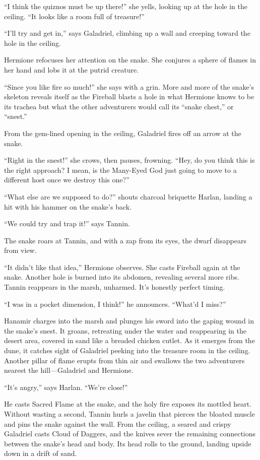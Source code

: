 \documentclass[smalldemyvopaper,11pt,twoside,onecolumn,openright,extrafontsizes]{memoir}
\begin{document}
``I think the quiznos must be up there!'' she yells, looking up at the
hole in the ceiling. ``It looks like a room full of treasure!''

``I'll try and get in,'' says Galadriel, climbing up a wall and creeping
toward the hole in the ceiling.

Hermione refocuses her attention on the snake. She conjures a sphere of
flames in her hand and lobs it at the putrid creature.

``Since you like fire so much!'' she says with a grin. More and more of
the snake's skeleton reveals itself as the Fireball blasts a hole in
what Hermione knows to be its trachea but what the other adventurers
would call its ``snake chest,'' or ``snest.''

From the gem-lined opening in the ceiling, Galadriel fires off an arrow
at the snake.

``Right in the snest!'' she crows, then pauses, frowning. ``Hey, do you
think this is the right approach? I mean, is the Many-Eyed God just
going to move to a different host once we destroy this one?''

``What else are we supposed to do?'' shouts charcoal briquette Harlan,
landing a hit with his hammer on the snake's back.

``We could try and trap it!'' says Tannin.

The snake roars at Tannin, and with a zap from its eyes, the dwarf
disappears from view.

``It didn't like that idea,'' Hermione observes. She casts Fireball
again at the snake. Another hole is burned into its abdomen, revealing
several more ribs. Tannin reappears in the marsh, unharmed. It's
honestly perfect timing.

``I was in a pocket dimension, I think!'' he announces. ``What'd I
miss?''

Hanamir charges into the marsh and plunges his sword into the gaping
wound in the snake's snest. It groans, retreating under the water and
reappearing in the desert area, covered in sand like a breaded chicken
cutlet. As it emerges from the dune, it catches sight of Galadriel
peeking into the treasure room in the ceiling. Another pillar of flame
erupts from thin air and swallows the two adventurers nearest the
hill---Galadriel and Hermione.

``It's angry,'' says Harlan. ``We're close!''

He casts Sacred Flame at the snake, and the holy fire exposes its
mottled heart. Without wasting a second, Tannin hurls a javelin that
pierces the bloated muscle and pins the snake against the wall. From the
ceiling, a seared and crispy Galadriel casts Cloud of Daggers, and the
knives sever the remaining connections between the snake's head and
body. Its head rolls to the ground, landing upside down in a drift of
sand.
\end{document}
